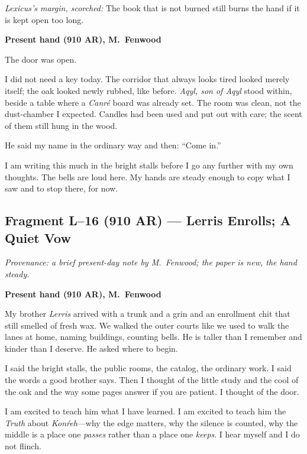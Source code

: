 \documentclass[11pt]{article}
\begin{document}
\medskip
\noindent\textit{Lexicus’s margin, scorched:} The book that is not burned still burns the hand if it is kept open too long.

\medskip
\noindent\textbf{Present hand (910 AR), M.\ Fenwood}

The door was open.

I did not need a key today. The corridor that always looks tired looked merely itself; the oak looked newly rubbed, like before. \textit{Aqyl, son of Aqyl} stood within, beside a table where a \textit{Canr\'e} board was already set. The room was clean, not the dust-chamber I expected. Candles had been used and put out with care; the scent of them still hung in the wood.

He said my name in the ordinary way and then: “Come in.”

I am writing this much in the bright stalls before I go any further with my own thoughts. The bells are loud here. My hands are steady enough to copy what I saw and to stop there, for now.

\subsection{Fragment L--16 (910 AR) --- Lerris Enrolls; A Quiet Vow}
\label{frag:l16}
{}

\noindent\textit{Provenance: a brief present-day note by M.\ Fenwood; the paper is new, the hand steady.}

\medskip
\noindent\textbf{Present hand (910 AR), M.\ Fenwood}

My brother \textit{Lerris} arrived with a trunk and a grin and an enrollment chit that still smelled of fresh wax. We walked the outer courts like we used to walk the lanes at home, naming buildings, counting bells. He is taller than I remember and kinder than I deserve. He asked where to begin.

I said the bright stalls, the public rooms, the catalog, the ordinary work. I said the words a good brother says. Then I thought of the little study and the cool of the oak and the way some pages answer if you are patient. I thought of the door.

I am excited to teach him what I have learned. I am excited to teach him the \textit{Truth} about \textit{Kon\'reh}—why the edge matters, why the silence is counted, why the middle is a place one \emph{passes} rather than a place one \emph{keeps}. I hear myself and I do not flinch.
\end{document}
